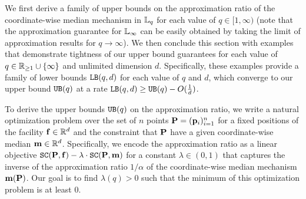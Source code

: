 We first derive a family of upper bounds on the approximation ratio of the coordinate-wise median mechanism in $\lqnorm$ for each value of $q\in[1,\infty)$ (note that the approximation guarantee for $\lqnorm[\infty]$ can be easily obtained by taking the limit of approximation results for $q\to\infty$). We then conclude this section with examples that demonstrate tightness of our upper bound guarantees for each value of $q\in\reals_{\ge 1}\cup\{\infty\}$
and unlimited dimension $d$. Specifically, these examples provide a family of lower bounds $\LB(q,d)$ for each value of $q$ and $d$, which converge to our upper bound $\UB(q)$ at a rate $\LB(q,d)\ge\UB(q)-O(\frac{1}{d})$.  

To derive the upper bounds $\UB(q)$ on the approximation ratio, we write a natural optimization problem over the set of $n$ points $\locs=(\loci)_{i=1}^n$ for a fixed positions of the facility $\facility\in\reals^d$ and the constraint that $\locs$ have a given coordinate-wise median $\median\in\reals^d$. Specifically, we encode the approximation ratio as a linear objective $\SC(\locs,\facility)-\lambda\cdot\SC(\locs,\median)$ for a constant 
$\lambda\in(0,1)$ that captures the inverse of the approximation 
ratio $1/\alpha$ of the coordinate-wise median mechanism $\median(\locs)$.
Our goal is to find $\lambda(q)>0$ such that the minimum of this optimization problem is at least $0$.

